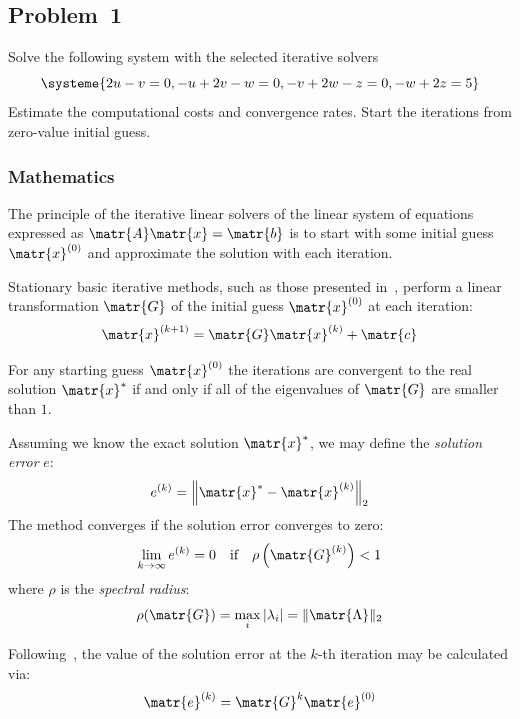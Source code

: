 \subsection{Problem~1}%
\label{problem:1}

Solve the following system with the selected iterative solvers
\begin{equation*}
  \systeme{2u-v=0,-u+2v-w=0,-v+2w-z=0,-w+2z=5}
\end{equation*}
Estimate the computational costs and convergence rates.
Start the iterations from zero-value initial guess.

\subsubsection*{Mathematics}

The principle of the iterative linear solvers of the linear system of equations
expressed as $\matr{A}\matr{x}=\matr{b}$ is to start with some initial guess
$\matr{x}^{(0)}$ and approximate the solution with each iteration.

Stationary basic iterative methods, such as those presented in~,
perform a linear transformation $\matr{G}$ of the initial guess $\matr{x}^{(0)}$ at each
iteration:
\begin{equation*}
  \matr{x}^{(k+1)} = \matr{G}\matr{x}^{(k)} + \matr{c}
\end{equation*}

For any starting guess $\matr{x}^{(0)}$ the iterations are convergent to the real
solution $\matr{x}^{*}$ if and only if all of the eigenvalues of $\matr{G}$ are smaller
than $1$.

Assuming we know the exact solution $\matr{x}^*$, we may define the
\textit{solution error} $e$:
\begin{equation*}
  e^{(k)} = {\left\lVert\matr{x}^{*}-\matr{x}^{(k)}\right\rVert}_2
\end{equation*}
The method converges if the solution error converges to zero:
\begin{equation}
  \label{eqn:convergence_criterion}
  \lim_{k\to\infty}{e^{(k)}} = 0
  \quad \text{if} \quad
  \rho\left(\matr{G}^{(k)}\right) < 1
\end{equation}
where $\rho$ is the \textit{spectral radius}:
\begin{equation*}
  \rho(\matr{G}) = \max_i{\lvert\lambda_i\rvert} = \lVert\matr{\Lambda}\rVert_2
\end{equation*}

Following~\cite{Zdunek}, the value of the solution error at the $k$-th iteration may be
calculated via:
\begin{equation}
  \matr{e}^{(k)} = \matr{G}^k \matr{e}^{(0)}
\end{equation}

